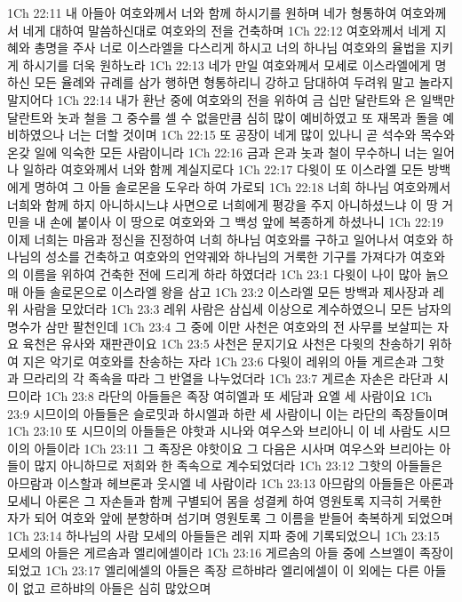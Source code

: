 1Ch 22:11  내 아들아 여호와께서 너와 함께 하시기를 원하며 네가 형통하여 여호와께서 네게 대하여 말씀하신대로 여호와의 전을 건축하며
1Ch 22:12  여호와께서 네게 지혜와 총명을 주사 너로 이스라엘을 다스리게 하시고 너의 하나님 여호와의 율법을 지키게 하시기를 더욱 원하노라
1Ch 22:13  네가 만일 여호와께서 모세로 이스라엘에게 명하신 모든 율례와 규례를 삼가 행하면 형통하리니 강하고 담대하여 두려워 말고 놀라지 말지어다
1Ch 22:14  내가 환난 중에 여호와의 전을 위하여 금 십만 달란트와 은 일백만 달란트와 놋과 철을 그 중수를 셀 수 없을만큼 심히 많이 예비하였고 또 재목과 돌을 예비하였으나 너는 더할 것이며
1Ch 22:15  또 공장이 네게 많이 있나니 곧 석수와 목수와 온갖 일에 익숙한 모든 사람이니라
1Ch 22:16  금과 은과 놋과 철이 무수하니 너는 일어나 일하라 여호와께서 너와 함께 계실지로다
1Ch 22:17  다윗이 또 이스라엘 모든 방백에게 명하여 그 아들 솔로몬을 도우라 하여 가로되
1Ch 22:18  너희 하나님 여호와께서 너희와 함께 하지 아니하시느냐 사면으로 너희에게 평강을 주지 아니하셨느냐 이 땅 거민을 내 손에 붙이사 이 땅으로 여호와와 그 백성 앞에 복종하게 하셨나니
1Ch 22:19  이제 너희는 마음과 정신을 진정하여 너희 하나님 여호와를 구하고 일어나서 여호와 하나님의 성소를 건축하고 여호와의 언약궤와 하나님의 거룩한 기구를 가져다가 여호와의 이름을 위하여 건축한 전에 드리게 하라 하였더라
1Ch 23:1  다윗이 나이 많아 늙으매 아들 솔로몬으로 이스라엘 왕을 삼고
1Ch 23:2  이스라엘 모든 방백과 제사장과 레위 사람을 모았더라
1Ch 23:3  레위 사람은 삼십세 이상으로 계수하였으니 모든 남자의 명수가 삼만 팔천인데
1Ch 23:4  그 중에 이만 사천은 여호와의 전 사무를 보살피는 자요 육천은 유사와 재판관이요
1Ch 23:5  사천은 문지기요 사천은 다윗의 찬송하기 위하여 지은 악기로 여호와를 찬송하는 자라
1Ch 23:6  다윗이 레위의 아들 게르손과 그핫과 므라리의 각 족속을 따라 그 반열을 나누었더라
1Ch 23:7  게르손 자손은 라단과 시므이라
1Ch 23:8  라단의 아들들은 족장 여히엘과 또 세담과 요엘 세 사람이요
1Ch 23:9  시므이의 아들들은 슬로밋과 하시엘과 하란 세 사람이니 이는 라단의 족장들이며
1Ch 23:10  또 시므이의 아들들은 야핫과 시나와 여우스와 브리아니 이 네 사람도 시므이의 아들이라
1Ch 23:11  그 족장은 야핫이요 그 다음은 시사며 여우스와 브리아는 아들이 많지 아니하므로 저희와 한 족속으로 계수되었더라
1Ch 23:12  그핫의 아들들은 아므람과 이스할과 헤브론과 웃시엘 네 사람이라
1Ch 23:13  아므람의 아들들은 아론과 모세니 아론은 그 자손들과 함께 구별되어 몸을 성결케 하여 영원토록 지극히 거룩한 자가 되어 여호와 앞에 분향하며 섬기며 영원토록 그 이름을 받들어 축복하게 되었으며
1Ch 23:14  하나님의 사람 모세의 아들들은 레위 지파 중에 기록되었으니
1Ch 23:15  모세의 아들은 게르솜과 엘리에셀이라
1Ch 23:16  게르솜의 아들 중에 스브엘이 족장이 되었고
1Ch 23:17  엘리에셀의 아들은 족장 르하뱌라 엘리에셀이 이 외에는 다른 아들이 없고 르하뱌의 아들은 심히 많았으며
